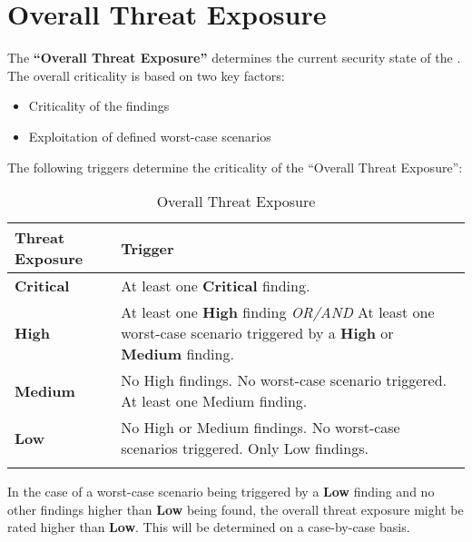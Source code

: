 \section{Overall Threat Exposure}
\label{appendix:OverallThreatExposure}
The \textbf{“Overall Threat Exposure”} determines the current security state of the \PrintAssetName. The overall criticality is based on two key factors: 
\begin{itemize}
	\item	Criticality of the findings
	\item	Exploitation of defined worst-case scenarios
\end{itemize}

The following triggers determine the criticality of the “Overall Threat Exposure”:


\begin{xltabular}{\textwidth}{|l|X|}
	\hline
	 \textbf{Threat Exposure} &  \textbf{Trigger}\\
	\hline
	 \textbf{Critical} & At least one \textbf{Critical} finding. \\
	\hline
	 \textbf{High} & At least one \textbf{High} finding \textit{OR/AND} \newline At least one worst-case scenario triggered by a \textbf{High} or \textbf{Medium} finding. \\
	 \textbf{Medium} & No High findings. \newline No worst-case scenario triggered. \newline At least one Medium finding. \\
	\hline
	 \textbf{Low} & No High or Medium findings. \newline No worst-case scenarios triggered. \newline Only Low findings. \\
	\hline
\caption{Overall Threat Exposure} \label{table:OverallThreatExposureAppendix}
\end{xltabular}
	
In the case of a worst-case scenario being triggered by a \textbf{Low} finding and no other findings higher than \textbf{Low} being found, the overall threat exposure might be rated higher than \textbf{Low}. This will be determined on a case-by-case basis. 


